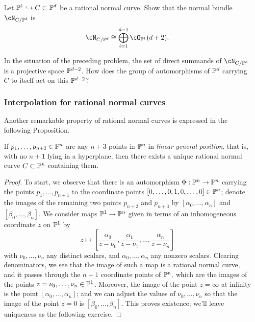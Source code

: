 \begin{exercise}
Let $\PP^1 \hookrightarrow C \subset \PP^d$ be a rational normal curve. Show that the normal bundle $\cN_{C/\PP^d}$  is 
$$
\cN_{C/\PP^d} \cong \bigoplus_{i=1}^{d-1} \cO_{\PP^1}(d+2).
$$
\end{exercise}

\begin{exercise}
In the situation of the preceding problem, the set  of direct summands of $\cN_{C/\PP^d} $ is a projective space $\PP^{d-2}$. How does the  group of automorphisms of $\PP^d$ carrying $C$ to itself act on this $\PP^{d-2}$?

\end{exercise}

\subsubsection{Interpolation for rational normal curves}

Another remarkable property of rational normal curves is expressed in the following Proposition.


\begin{proposition}\label{points on rnc}
If $p_1,\dots, p_{n+3} \in \PP^n$ are any $n+3$ points in $\PP^n$ in \emph{linear general position}, that is, with no $n+1$ lying in a hyperplane, then there exists a unique rational normal curve $C \subset \PP^n$ containing them.
 \end{proposition}

\begin{proof}
To start, we observe that there is an automorphism $\Phi : \PP^n \to \PP^n$ carrying the points $p_1,\dots,p_{n+1}$ to the coordinate points $[0,\dots,0,1,0,\dots,0] \in \PP^n$; denote the images of the remaining two points $p_{n+2}$ and $p_{n+3}$ by $[\alpha_0,\dots,\alpha_n]$ and $[\beta_0,\dots,\beta_n]$. We consider maps $\PP^1 \to \PP^n$ given in terms of an inhomogeneous coordinate $z$ on $\PP^1$ by
$$
z \mapsto \left[ \frac{\alpha_0}{z - \nu_0}, \frac{\alpha_1}{z - \nu_1} , \dots, \frac{\alpha_n}{z - \nu_n}  \right]
$$
with $\nu_0,\dots,\nu_n$ any distinct scalars, and $\alpha_0,\dots,\alpha_n$ any nonzero  scalars. Clearing denominators, we see that the image of such a map is a rational normal curve, and it passes through the $n+1$ coordinate points of $\PP^n$, which are the images of the points $z = \nu_0, \dots, \nu_n \in \PP^1$. Moreover, the image of the point $z = \infty$ at infinity is the point $[\alpha_0,\dots,\alpha_n]$; and we can adjust the values of $\nu_0,\dots,\nu_n$ so that the image of the point $z = 0$ is $[\beta_0,\dots,\beta_n]$. This proves existence; we'll leave uniqueness as the following exercise. 
\end{proof}

